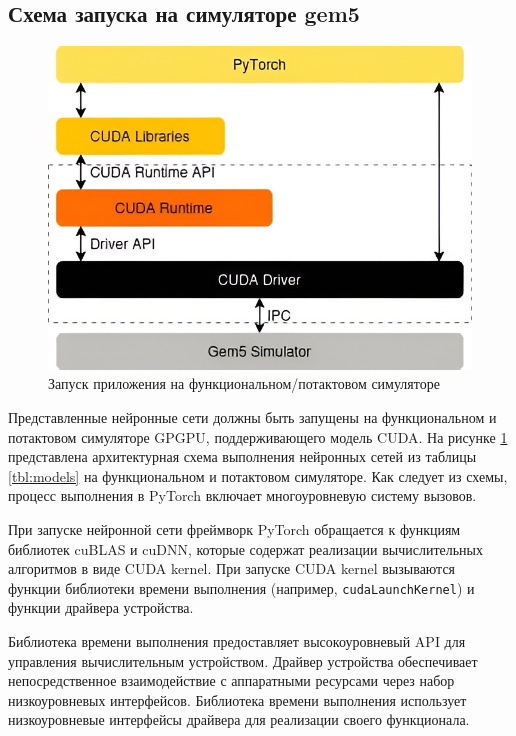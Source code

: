 \subsection{Схема запуска на симуляторе gem5}

\begin{figure}
    \centering
    \includegraphics[scale=0.4]{src/images/launch_scheme.jpeg}
    \caption{Запуск приложения на функциональном/потактовом симуляторе}
    \label{fig:launch_scheme}
\end{figure}

Представленные нейронные сети должны быть запущены на функциональном и потактовом симуляторе GPGPU, поддерживающего модель CUDA.
На рисунке \ref{fig:launch_scheme} представлена архитектурная схема выполнения нейронных сетей из таблицы \ref{tbl:models}
на функциональном и потактовом симуляторе. Как следует из схемы, процесс выполнения в PyTorch включает
многоуровневую систему вызовов.

При запуске нейронной сети фреймворк PyTorch обращается к функциям библиотек cuBLAS и cuDNN, которые содержат реализации вычислительных
алгоритмов в виде CUDA kernel. При запуске CUDA kernel вызываются функции библиотеки времени выполнения (например, \texttt{cudaLaunchKernel})
и функции драйвера устройства.

Библиотека времени выполнения предоставляет высокоуровневый API для управления вычислительным устройством.
Драйвер устройства обеспечивает непосредственное взаимодействие с аппаратными ресурсами
через набор низкоуровневых интерфейсов. Библиотека времени выполнения использует низкоуровневые интерфейсы драйвера
для реализации своего функционала.

